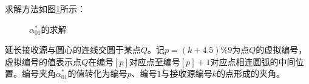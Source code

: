 \documentclass[12pt]{ctexart}
\begin{document}
\begin{spacing}{1.5}
求解方法如图\ref{tu7}所示：
\begin{figure}[H]
	\caption{$\alpha_{01}^{*}$的求解}
	\label{tu7}
\end{figure}

延长接收源与圆心的连线交圆于某点$Q$。记$p=(k+4.5)\%9$为点$Q$的虚拟编号，虚拟编号的值表示点$Q$在编号$[p]$对应点至编号$[p]+1$对应点相连圆弧的中间位置。编号夹角$\alpha_{01}^{*}$的值转化为编号$p$、编号$1$与接收源编号$k$的点形成的夹角。


\end{spacing}
\end{document}
